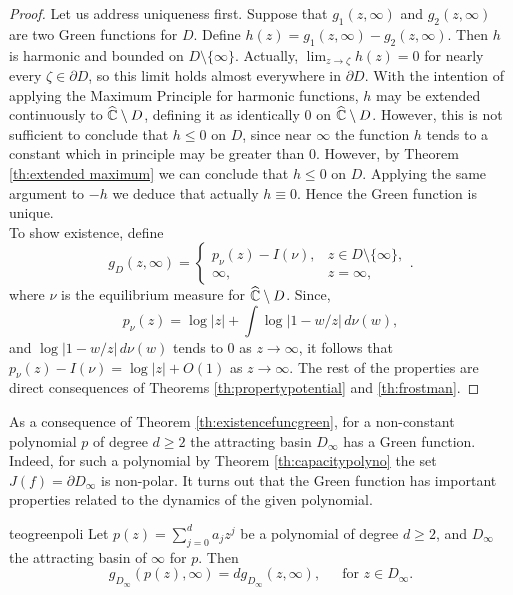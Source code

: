 \begin{proof}
Let us address uniqueness first. Suppose that $g_1(z,\infty)$ and $g_2(z,\infty)$ are two Green functions for $D$. Define $h(z)=g_1(z,\infty)-g_2(z,\infty)$. Then $h$ is harmonic and bounded on $D\setminus\{\infty\}$. Actually, $\lim_{z\rightarrow \zeta}h(z) = 0$ for nearly every $\zeta\in \partial D$, so this limit holds almost everywhere in $\partial D$. With the intention of applying the Maximum Principle for harmonic functions, $h$ may be extended continuously to $\widehat{\mathbb{C}}\setminus D$, defining it as identically $0$ on $\widehat{\mathbb{C}} \setminus D$. However, this is not sufficient to conclude that $h\leq 0$ on $D$, since near $\infty$ the function $h$ tends to a constant which in principle may be greater than $0$. However, by Theorem \ref{th:extended maximum} we can conclude that $h\leq 0$ on $D$. Applying the same argument to $-h$ we deduce that actually $h\equiv 0$. Hence the Green function is unique.\\

To show existence, define
$$g_D(z,\infty) = \begin{cases}
p_\nu(z)-I(\nu), & z\in D\setminus\{\infty\},\\
\infty, & z=\infty,
\end{cases}.$$
where $\nu$ is the equilibrium measure for $\widehat{\mathbb{C}}\setminus D$. Since,
$$p_\nu(z) = \log|z| + \int \log|1-w/z|\,d\nu(w),$$
and $\log|1-w/z|\,d\nu(w)$ tends to $0$ as $z\rightarrow \infty$, it follows that $p_\nu(z)-I(\nu) = \log|z| + O(1)$ as $z\rightarrow \infty$. The rest of the properties are direct consequences of Theorems \ref{th:propertypotential} and \ref{th:frostman}.
\end{proof}

As a consequence of Theorem \ref{th:existencefuncgreen}, for a non-constant polynomial $p$ of degree $d\geq 2$ the attracting basin $D_\infty$ has a Green function. Indeed, for such a polynomial by Theorem \ref{th:capacitypolyno} the set $J(f)=\partial D_\infty$ is non-polar. It turns out that the Green function has important properties related to the dynamics of the given polynomial.\\

\begin{mytheo}{}{teogreenpoli}
Let $p(z)=\sum_{j=0}^da_jz^j$ be a polynomial of degree $d\geq 2$, and $D_\infty$ the attracting basin of $\infty$ for $p$. Then
$$g_{D_\infty}(p(z),\infty) = d g_{D_\infty}(z,\infty), \quad \,\text{ for }z\in D_\infty.$$
\end{mytheo}

